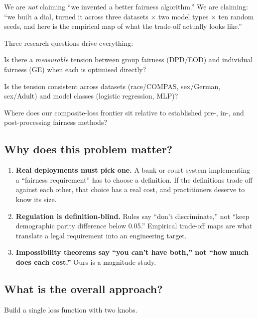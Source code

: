 \documentclass[11pt,a4paper]{article}
\begin{document}
We are \emph{not} claiming ``we invented a better fairness algorithm.'' We are
claiming: ``we built a dial, turned it across three datasets $\times$ two model
types $\times$ ten random seeds, and here is the empirical map of what the
trade-off actually looks like.''

Three research questions drive everything:

\begin{description}[leftmargin=3.2em,style=nextline,font=\bfseries\color{accent}]
\item[RQ1] Is there a \emph{measurable} tension between group fairness
(DPD/EOD) and individual fairness (GE) when each is optimised directly?
\item[RQ2] Is the tension consistent across datasets (race/COMPAS, sex/German,
sex/Adult) and model classes (logistic regression, MLP)?
\item[RQ3] Where does our composite-loss frontier sit relative to established
pre-, in-, and post-processing fairness methods?
\end{description}

\subsection{Why does this problem matter?}

\begin{enumerate}
\item \textbf{Real deployments must pick one.} A bank or court system
implementing a ``fairness requirement'' has to choose a definition. If the
definitions trade off against each other, that choice has a real cost, and
practitioners deserve to know its size.
\item \textbf{Regulation is definition-blind.} Rules say ``don't
discriminate,'' not ``keep demographic parity difference below 0.05.''
Empirical trade-off maps are what translate a legal requirement into an
engineering target.
\item \textbf{Impossibility theorems say ``you can't have both,'' not ``how
much does each cost.''} Ours is a magnitude study.
\end{enumerate}

\subsection{What is the overall approach?}

Build a single loss function with two knobs.
\end{document}
